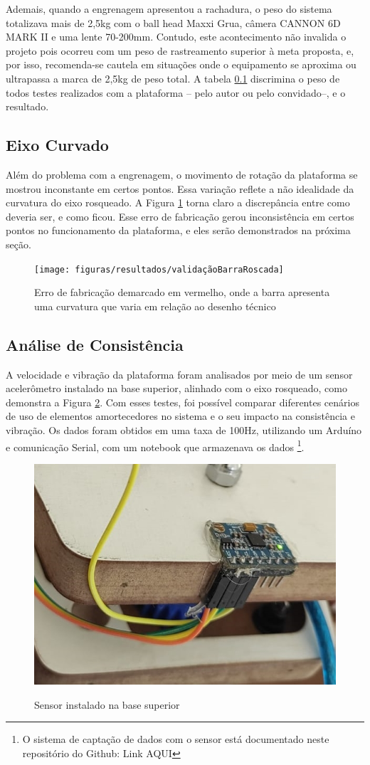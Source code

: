 Ademais, quando a engrenagem apresentou a rachadura, o peso do sistema totalizava mais de 2,5kg com o ball head Maxxi Grua, câmera CANNON 6D MARK II e uma lente 70-200mm. Contudo, este acontecimento não invalida o projeto pois ocorreu com um peso de rastreamento superior à meta proposta, e, por isso, recomenda-se cautela em situações onde o equipamento se aproxima ou ultrapassa a marca de 2,5kg de peso total. A tabela \ref{} discrimina o peso de todos testes realizados com a plataforma -- pelo autor ou pelo convidado--, e o resultado.

 

\subsection{Eixo Curvado}
Além do problema com a engrenagem, o movimento de rotação da plataforma se mostrou inconstante em certos pontos. Essa variação reflete a não idealidade da curvatura do eixo rosqueado. A Figura \ref{fig:validaçãoBarraRoscada} torna claro a discrepância entre como deveria ser, e como ficou. Esse erro de fabricação gerou inconsistência em certos pontos no funcionamento da plataforma, e eles serão demonstrados na próxima seção.

\begin{figure}[htb]
	\centering
	\caption{Erro de fabricação demarcado em vermelho, onde a barra apresenta uma curvatura que varia em relação ao desenho técnico}
	\texttt{[image: figuras/resultados/validaçãoBarraRoscada]}
	\label{fig:validaçãoBarraRoscada}
\end{figure}


\subsection{Análise de Consistência}
\label{sec:vibracao}

A velocidade e vibração da plataforma foram analisados por meio de um sensor acelerômetro instalado na base superior, alinhado com o eixo rosqueado, como demonstra a Figura \ref{fig:sensorInstaladoPlataforma}. Com esses testes, foi possível comparar diferentes cenários de uso de elementos amortecedores no sistema e o seu impacto na consistência e vibração. Os dados foram obtidos em uma taxa de 100Hz, utilizando um Arduíno e comunicação Serial, com um notebook que armazenava os dados \footnote{O sistema de captação de dados com o sensor está documentado neste repositório do Github: Link AQUI}. 

\begin{figure}[htb]
	\centering
	\caption{Sensor instalado na base superior}
	\includegraphics[width=0.35\linewidth]{figuras/resultados/sensorInstaladoPlataforma}
	\label{fig:sensorInstaladoPlataforma}
\end{figure}

